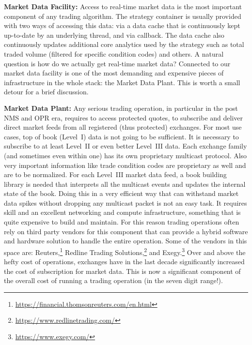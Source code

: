 \noindent\textbf{Market Data Facility:} Access to real-time market data is the most important component of any trading algorithm. The strategy container is usually provided with two ways of accessing this data: via a data cache that is continuously kept up-to-date by an underlying thread, and via callback. The data cache also continuously updates additional core analytics used by the strategy such as total traded volume (filtered for specific condition codes) and others. A natural question is how do we actually get real-time market data? Connected to our market data facility is one of the most demanding and expensive pieces of infrastructure in the whole stack: the Market Data Plant. This is worth a small detour for a brief discussion. \twomedskip


\noindent\textbf{Market Data Plant:}  Any serious trading operation, in particular in the post NMS and OPR era, requires to access protected quotes, to subscribe and deliver direct market feeds from all registered (thus protected) exchanges. For most use cases, top of book (Level~I) data is not going to be sufficient. It is necessary to subscribe to at least Level~II or even better Level~III data. Each exchange family (and sometimes even within one) has its own proprietary multicast protocol. Also very important information like trade condition codes are proprietary as well and are to be normalized. For each Level~III\label{in:level3dat4} market data feed, a book building library is needed that interprets all the multicast events and updates the internal state of the book. Doing this in a very efficient way that can withstand market data spikes without dropping any multicast packet is not an easy task. It requires skill and an excellent networking and compute infrastructure, something that is quite expensive to build and maintain. For this reason trading operations often rely on third party vendors for this component that can provide a hybrid software and hardware solution to handle the entire operation. Some of the vendors in this space are: Reuters,\footnote{\url{https://financial.thomsonreuters.com/en.html}} Redline Trading Solutions,\footnote{\url{https://www.redlinetrading.com/}} and Exegy.\footnote{\url{https://www.exegy.com/}} Over and above the hefty cost of operations, exchanges have in the last decade significantly increased the cost of subscription for market data. This is now a significant component of the overall cost of running a trading operation (in the seven digit range!). \twomedskip


